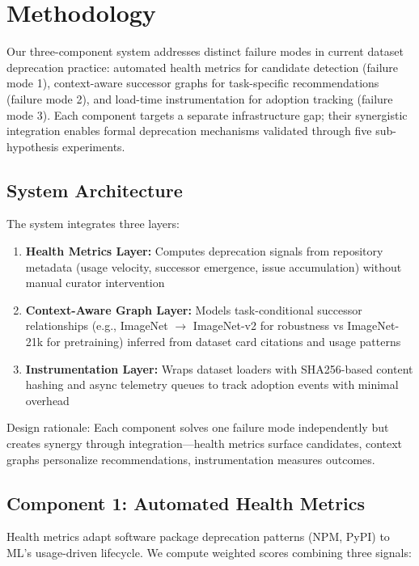 \section{Methodology}

Our three-component system addresses distinct failure modes in current dataset deprecation practice: automated health metrics for candidate detection (failure mode 1), context-aware successor graphs for task-specific recommendations (failure mode 2), and load-time instrumentation for adoption tracking (failure mode 3). Each component targets a separate infrastructure gap; their synergistic integration enables formal deprecation mechanisms validated through five sub-hypothesis experiments.

\subsection{System Architecture}

The system integrates three layers:

\begin{enumerate}
\item \textbf{Health Metrics Layer:} Computes deprecation signals from repository metadata (usage velocity, successor emergence, issue accumulation) without manual curator intervention

\item \textbf{Context-Aware Graph Layer:} Models task-conditional successor relationships (e.g., ImageNet $\rightarrow$ ImageNet-v2 for robustness vs ImageNet-21k for pretraining) inferred from dataset card citations and usage patterns

\item \textbf{Instrumentation Layer:} Wraps dataset loaders with SHA256-based content hashing and async telemetry queues to track adoption events with minimal overhead
\end{enumerate}

Design rationale: Each component solves one failure mode independently but creates synergy through integration---health metrics surface candidates, context graphs personalize recommendations, instrumentation measures outcomes.

\subsection{Component 1: Automated Health Metrics}

Health metrics adapt software package deprecation patterns (NPM, PyPI) to ML's usage-driven lifecycle. We compute weighted scores combining three signals:

